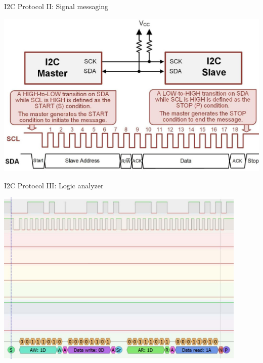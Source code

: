 \begin{frame}{I2C Protocol II: Signal messaging}
    \begin{itemize}
        \includegraphics[width=\textwidth]{trainingmaterials/i2c/i2c-signals.jpg}
    \end{itemize}
\end{frame}

\begin{frame}{I2C Protocol III: Logic analyzer}
    \begin{itemize}
        \includegraphics[width=0.9\textwidth]{trainingmaterials/i2c/i2c-signal-logic-analyzer.jpg}
    \end{itemize}
\end{frame}

